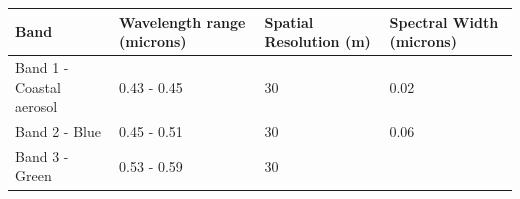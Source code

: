 \documentclass[]{book}
\begin{document}
\begin{longtable}[]{@{}llll@{}}
\toprule
\begin{minipage}[b]{0.36\columnwidth}\raggedright
Band\strut
\end{minipage} & \begin{minipage}[b]{0.18\columnwidth}\raggedright
Wavelength range (microns)\strut
\end{minipage} & \begin{minipage}[b]{0.19\columnwidth}\raggedright
Spatial Resolution (m)\strut
\end{minipage} & \begin{minipage}[b]{0.16\columnwidth}\raggedright
Spectral Width (microns)\strut
\end{minipage}\tabularnewline
\midrule
\endhead
\begin{minipage}[t]{0.36\columnwidth}\raggedright
Band 1 - Coastal aerosol\strut
\end{minipage} & \begin{minipage}[t]{0.18\columnwidth}\raggedright
0.43 - 0.45\strut
\end{minipage} & \begin{minipage}[t]{0.19\columnwidth}\raggedright
30\strut
\end{minipage} & \begin{minipage}[t]{0.16\columnwidth}\raggedright
0.02\strut
\end{minipage}\tabularnewline
\begin{minipage}[t]{0.36\columnwidth}\raggedright
Band 2 - Blue\strut
\end{minipage} & \begin{minipage}[t]{0.18\columnwidth}\raggedright
0.45 - 0.51\strut
\end{minipage} & \begin{minipage}[t]{0.19\columnwidth}\raggedright
30\strut
\end{minipage} & \begin{minipage}[t]{0.16\columnwidth}\raggedright
0.06\strut
\end{minipage}\tabularnewline
\begin{minipage}[t]{0.36\columnwidth}\raggedright
Band 3 - Green\strut
\end{minipage} & \begin{minipage}[t]{0.18\columnwidth}\raggedright
0.53 - 0.59\strut
\end{minipage} & \begin{minipage}[t]{0.19\columnwidth}\raggedright
30\strut
\end{minipage} & \begin{minipage}[t]{0.16\columnwidth}\raggedright

\end{minipage}
\end{longtable}
\end{document}

